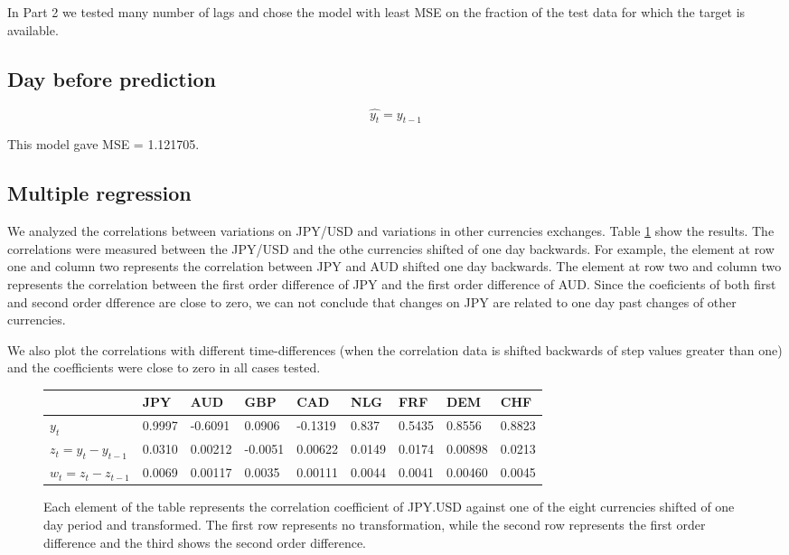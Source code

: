 In Part 2 we tested many number of lags and chose the model with least MSE on 
the fraction of the test data for which the  target is available.


\subsection{Day before prediction}

 $$\hat{y_t} = y_{t-1}$$

This model gave MSE = 1.121705.

\subsection{Multiple regression}

We analyzed the correlations between variations on JPY/USD 
and variations in other currencies exchanges. Table \ref{tab:corrCoef} show the results.
The correlations were measured between the JPY/USD and the othe currencies shifted of one day backwards.
For example, the element at row one and column two represents the correlation between JPY and AUD
shifted one day backwards.
The element at row two and column two represents the correlation between the first order difference of 
JPY and the first order difference of AUD.
Since the coeficients of both first and second order dfference are close to zero, we can not conclude that
changes on JPY are related to one day past changes of other currencies.

We also plot the correlations with different time-differences 
(when the correlation data is shifted backwards of step values greater than one)
and the coefficients were close to zero in all cases tested.

\begin{figure}[!ht]
\begin{center}
    \begin{tabular}{| l | l | l | l | l | l | l | l | l |}
	\hline
		& JPY & AUD & GBP & CAD & NLG & FRF  & DEM & CHF    			\\ \hline \hline
$y_t$ 		& 0.9997  &-0.6091 & 0.0906  &-0.1319  & 0.837  & 0.5435  & 0.8556  & 0.8823   \\ \hline
$z_t=y_t-y_{t-1}$ &0.0310&0.00212  & -0.0051 & 0.00622 & 0.0149 & 0.0174  & 0.00898 & 0.0213   \\ \hline
$w_t=z_t-z_{t-1}$ &0.0069& 0.00117 &  0.0035 &  0.00111& 0.0044 & 0.0041  & 0.00460 & 0.0045   \\ \hline
    \end{tabular}
\end{center}
	\caption{Each element of the table represents the correlation coefficient of JPY.USD against one of the eight currencies shifted of one day period and transformed. The first row represents no transformation, while the second row represents the first order difference and the third shows the second order difference.}
	\label{tab:corrCoef}
\end{figure}

